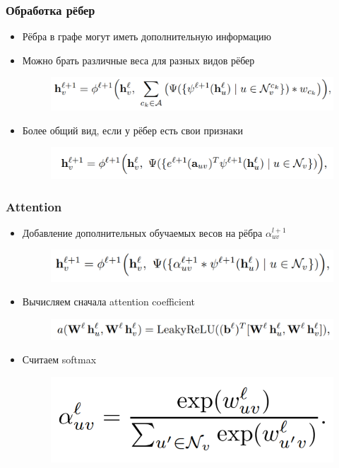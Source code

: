 \documentclass{beamer}
\begin{document}
\begin{frame}
\frametitle{Обработка рёбер}
\begin{itemize}
	\item Рёбра в графе могут иметь дополнительную информацию
	\item Можно брать различные веса для разных видов рёбер
\begin{figure}
	\includegraphics[width=0.9\columnwidth]{edges1.png}
\end{figure}
	\item Более общий вид, если у рёбер есть свои признаки
\begin{figure}
	\includegraphics[width=0.9\columnwidth]{edges2.png}
\end{figure}
	
\end{itemize}
\end{frame}

\begin{frame}
\frametitle{Attention}
\begin{itemize}
	\item Добавление дополнительных обучаемых весов на рёбра $\alpha_{uv}^{l + 1}$
\begin{figure}
	\includegraphics[width=0.8\columnwidth]{attention.png}
\end{figure}
	\item Вычисляем сначала attention coefficient
\begin{figure}
	\includegraphics[width=0.9\columnwidth]{attention_coefficient.png}
\end{figure}
	\item Считаем softmax
\begin{figure}
	\includegraphics[width=0.5\columnwidth]{attention_softmax.png}
\end{figure}
	
	
\end{itemize}
\end{frame}
\end{document}
